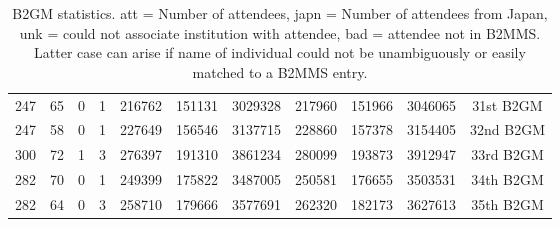 \begin{table}[htp]
\begin{center}
\begin{tabular}{|rrrr| rrr| rrr| c|}
 247&  65&   0&   1&    216762&    151131&   3029328&    217960&    151966&   3046065&31st B2GM \\ 
 247&  58&   0&   1&    227649&    156546&   3137715&    228860&    157378&   3154405&32nd B2GM \\ 
 300&  72&   1&   3&    276397&    191310&   3861234&    280099&    193873&   3912947&33rd B2GM \\ 
 282&  70&   0&   1&    249399&    175822&   3487005&    250581&    176655&   3503531&34th B2GM \\ 
 282&  64&   0&   3&    258710&    179666&   3577691&    262320&    182173&   3627613&35th B2GM \\ 
\hline 
\end{tabular} 
\label{tab:B2GM} 
\caption{B2GM statistics. att = Number of attendees, japn = Number of attendees from Japan, unk = could not associate institution with attendee, bad = attendee not in B2MMS. Latter case can arise if name of individual could not be unambiguously or easily matched to a B2MMS entry.} 
\end{center} 
\end{table} 
